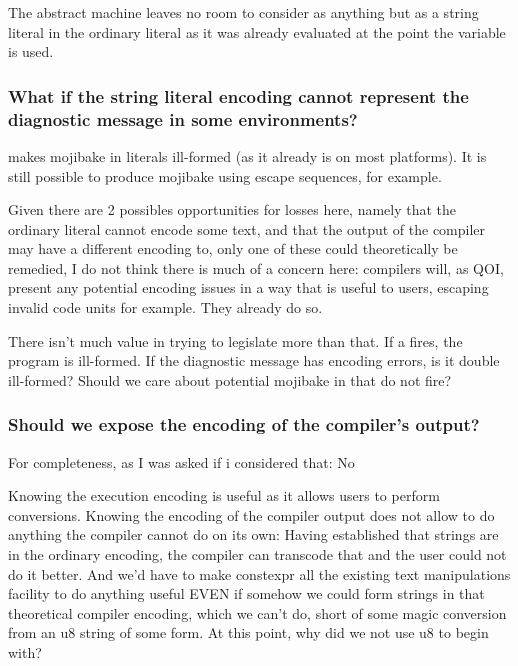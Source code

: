 \documentclass{wg21}
\begin{document}
The abstract machine leaves no room to consider  as anything but as a string literal in the ordinary literal as
it was already evaluated at the point the variable is used.

\subsubsection{What if the string literal encoding cannot represent the diagnostic message in some environments?}

 makes mojibake in literals ill-formed (as it already is on most platforms). It is still possible to produce mojibake using
escape sequences, for example.

Given there are 2 possibles opportunities for losses here, namely that the ordinary literal cannot encode some text, and that the
output of the compiler may have a different encoding to, only one of these could theoretically be remedied, I do not think there is much of a concern here: compilers will, as QOI, present any potential encoding issues in a way that is useful to users, escaping invalid code units for example.
They already do so.

There isn't much value in trying to legislate more than that.
If a  fires, the program is ill-formed. If the diagnostic message has encoding errors, is it double ill-formed?
Should we care about potential mojibake in  that do not fire?

\subsubsection{Should we expose the encoding of the compiler's output?}

For completeness, as I was asked if i considered that: No

Knowing the execution encoding is useful as it allows users to perform conversions.
Knowing the encoding of the compiler output does not allow to do anything the compiler cannot do on its own:
Having established that strings are in the ordinary encoding, the compiler can transcode that and the user could not do it better.
And we'd have to make constexpr all the existing text manipulations facility to do anything useful EVEN if somehow we could form strings in that
theoretical compiler encoding, which we can't do, short of some magic conversion from an u8 string of some form.
At this point, why did we not use u8 to begin with?
\end{document}
